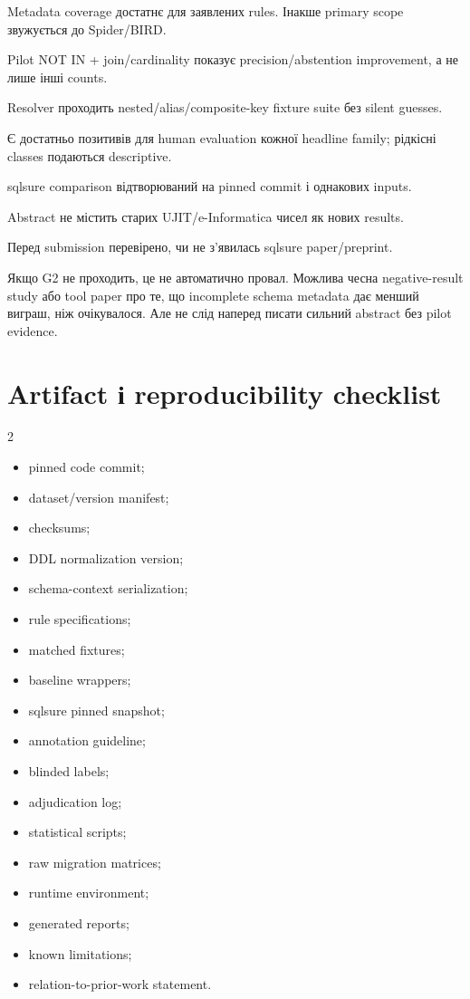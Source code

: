 \documentclass[11pt,a4paper]{article}
\begin{document}
\begin{description}[leftmargin=1.7cm,labelwidth=1.25cm]
\item[G1] Metadata coverage достатнє для заявлених rules. Інакше primary scope
звужується до Spider/BIRD.
\item[G2] Pilot NOT IN + join/cardinality показує precision/abstention improvement,
а не лише інші counts.
\item[G3] Resolver проходить nested/alias/composite-key fixture suite без silent guesses.
\item[G4] Є достатньо позитивів для human evaluation кожної headline family; рідкісні
classes подаються descriptive.
\item[G5] sqlsure comparison відтворюваний на pinned commit і однакових inputs.
\item[G6] Abstract не містить старих UJIT/e-Informatica чисел як нових results.
\item[G7] Перед submission перевірено, чи не з'явилась sqlsure paper/preprint.
\end{description}

\begin{warningbox}
Якщо G2 не проходить, це не автоматично провал. Можлива чесна negative-result study
або tool paper про те, що incomplete schema metadata дає менший виграш, ніж очікувалося.
Але не слід наперед писати сильний abstract без pilot evidence.
\end{warningbox}

\section{Artifact і reproducibility checklist}

\begin{multicols}{2}
\begin{itemize}
\item pinned code commit;
\item dataset/version manifest;
\item checksums;
\item DDL normalization version;
\item schema-context serialization;
\item rule specifications;
\item matched fixtures;
\item baseline wrappers;
\item sqlsure pinned snapshot;
\item annotation guideline;
\item blinded labels;
\item adjudication log;
\item statistical scripts;
\item raw migration matrices;
\item runtime environment;
\item generated reports;
\item known limitations;
\item relation-to-prior-work statement.
\end{itemize}
\end{multicols}
\end{document}
